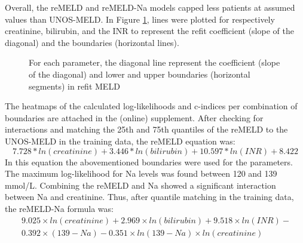 \documentclass[11pt,english,]{book} %
\begin{document}
Overall, the reMELD and reMELD-Na models capped less patients at assumed values than UNOS-MELD.
In Figure \ref{fig:refit-fig2}, lines were plotted for respectively creatinine, bilirubin, and the INR to represent the refit coefficient (slope of the diagonal) and the boundaries (horizontal lines).

\begin{figure}

{\centering {}\newline{}\newline{}

}

\caption{For each parameter, the diagonal line represent the coefficient (slope of the diagonal) and lower and upper boundaries (horizontal segments) in refit MELD}\label{fig:refit-fig2}
\end{figure}

The heatmaps of the calculated log-likelihoods and c-indices per combination of boundaries are attached in the (online) supplement. After checking for interactions and matching the 25th and 75th quantiles of the reMELD to the UNOS-MELD in the training data, the reMELD equation was: \[7.728*ln(creatinine) + 3.446*ln(bilirubin) + 10.597*ln(INR) + 8.422\] In this equation the abovementioned boundaries were used for the parameters.
The maximum log-likelihood for Na levels was found between 120 and 139 mmol/L. Combining the reMELD and Na showed a significant interaction between Na and creatinine. Thus, after quantile matching in the training data, the reMELD-Na formula was:
\begin{align*} 
\ 9.025\times ln(creatinine) + 2.969\times ln(bilirubin) + 9.518\times ln(INR) -\\ 
\ 0.392\times (139-Na) - 0.351\times ln(139-Na)\times ln(creatinine)
\end{align*}
\end{document}
